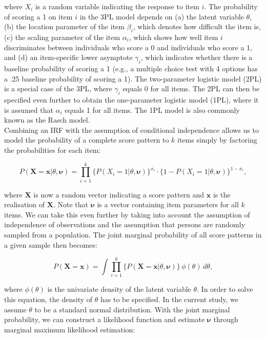 \documentclass[Royal,sageapa,times,doublespace]{sagej}
\begin{document}
where $X_i$ is a random variable indicating the response to item $i$. The probability of scoring a 1 on item $i$ in the 3PL model depends on (a) the latent variable $\theta$, (b) the location parameter of the item $\beta_{i}$, which denotes how difficult the item is, (c) the scaling parameter of the item $\alpha_{i}$, which shows how well item $i$ discriminates between individuals who score a 0 and individuals who score a 1, and (d) an item-specific lower asymptote $\gamma_{i}$, which indicates whether there is a baseline probability of scoring a 1 (e.g., a multiple choice test with 4 options has a .25 baseline probability of scoring a 1). The two-parameter logistic model (2PL) is a special case of the 3PL, where $\gamma_{i}$ equals 0 for all items. The 2PL can then be specified even further to obtain the one-parameter logistic model (1PL), where it is assumed that $\alpha_{i}$ equals 1 for all items. The 1PL model is also commonly known as the Rasch model. \\
\indent Combining an IRF with the assumption of conditional independence allows us to model the probability of a complete score pattern to $k$ items simply by factoring the probabilities for each item:

\begin{equation}
P(\boldsymbol{X} = \boldsymbol{x} | \theta, \boldsymbol{\nu}) = \prod_{i=1}^{k} \{P(X_i = 1 | \theta, \boldsymbol{\nu})\}^{x_i} \cdot  \{1 - P(X_i = 1 | \theta, \boldsymbol{\nu}) \}^{1 - x_i},
\end{equation}

where $\boldsymbol{X}$ is now a random vector indicating a score pattern and $\boldsymbol{x}$ is the realisation of $\boldsymbol{X}$. Note that $\boldsymbol{\nu}$ is a vector containing item parameters for all $k$ items. We can take this even further by taking into account the assumption of independence of observations and the assumption that persons are randomly sampled from a population. The joint marginal probability of all score patterns in a given sample then becomes:

\begin{equation}
P(\boldsymbol{X} = \boldsymbol{x}) = \int \prod_{i=1}^{k} \{ P(\boldsymbol{X} = \boldsymbol{x} | \theta, \boldsymbol{\nu}) \} \,\phi(\theta)\,d\theta,
\end{equation}

where $\phi(\theta)$ is the univariate density of the latent variable $\theta$. In order to solve this equation, the density of $\theta$ has to be specified. In the current study, we assume $\theta$ to be a standard normal distribution. With the joint marginal probability, we can construct a likelihood function and estimate $\boldsymbol{\nu}$ through marginal maximum likelihood estimation:
\end{document}
